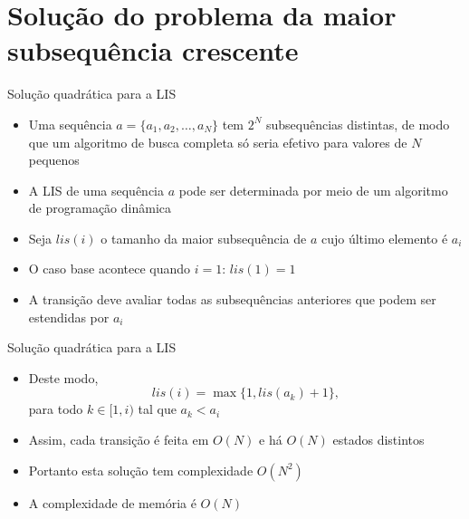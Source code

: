 \section{Solução do problema da maior subsequência crescente}

\begin{frame}[fragile]{Solução quadrática para a LIS}

    \begin{itemize}
        \item Uma sequência $a = \{ a_1, a_2, \ldots, a_N \}$ tem $2^N$ subsequências
            distintas, de modo que um algoritmo de busca completa só seria efetivo para
            valores de $N$ pequenos

        \item A LIS de uma sequência $a$ pode ser determinada por meio de um algoritmo de
            programação dinâmica

        \item Seja $lis(i)$ o tamanho da maior subsequência de $a$ cujo último elemento é
            $a_i$

        \item O caso base acontece quando $i = 1$: $lis(1) = 1$

        \item A transição deve avaliar todas as subsequências anteriores que podem 
            ser estendidas por $a_i$
    \end{itemize}

\end{frame}

\begin{frame}[fragile]{Solução quadrática para a LIS}

    \begin{itemize}
        \item Deste modo,
        \[
            lis(i) = \max \{ 1, lis(a_k) + 1 \},
        \]
        para todo $k\in [1, i)$ tal que $a_k < a_i$

        \item Assim, cada transição é feita em $O(N)$ e há $O(N)$ estados distintos

        \item Portanto esta solução tem complexidade $O(N^2)$

        \item A complexidade de memória é $O(N)$
    \end{itemize}

\end{frame}

